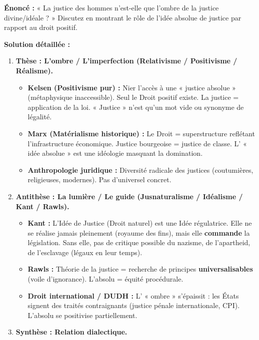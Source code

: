 \documentclass[11pt]{article}
\newcommand{\cle}[1]{{\popxbold\color{popdark}#1}}
\begin{document}
\begin{exoresolu}
\textbf{Énoncé :} « La justice des hommes n'est-elle que l'ombre de la justice divine/idéale ? » Discutez en montrant le rôle de l'idée absolue de justice par rapport au droit positif.

\tcblower
\textbf{Solution détaillée :}
\begin{enumerate}
    \item \textbf{Thèse : L'ombre / L'imperfection (Relativisme / Positivisme / Réalisme).}
    \begin{itemize}
        \item \textbf{Kelsen (Positivisme pur) :} Nier l'accès à une « justice absolue » (métaphysique inaccessible). Seul le Droit positif existe. La justice = application de la loi. « Justice » n'est qu'un mot vide ou synonyme de légalité.
        \item \textbf{Marx (Matérialisme historique) :} Le Droit = superstructure reflétant l'infrastructure économique. Justice bourgeoise = justice de classe. L' « idée absolue » est une idéologie masquant la domination.
        \item \textbf{Anthropologie juridique :} Diversité radicale des justices (coutumières, religieuses, modernes). Pas d'universel concret.
    \end{itemize}
    \item \textbf{Antithèse : La lumière / Le guide (Jusnaturalisme / Idéalisme / Kant / Rawls).}
    \begin{itemize}
        \item \textbf{Kant :} L'Idée de Justice (Droit naturel) est une \cle{Idée régulatrice}. Elle ne se réalise jamais pleinement (royaume des fins), mais elle \textbf{commande} la législation. Sans elle, pas de critique possible du nazisme, de l'apartheid, de l'esclavage (légaux en leur temps).
        \item \textbf{Rawls :} Théorie de la justice = recherche de principes \textbf{universalisables} (voile d'ignorance). L'absolu = équité procédurale.
        \item \textbf{Droit international / DUDH :} L' « ombre » s'épaissit : les États signent des traités contraignants (justice pénale internationale, CPI). L'absolu se \cle{positivise} partiellement.
    \end{itemize}
    \item \textbf{Synthèse : Relation dialectique.}
    \begin{itemize}

\end{itemize}
\end{enumerate}
\end{exoresolu}
\end{document}
